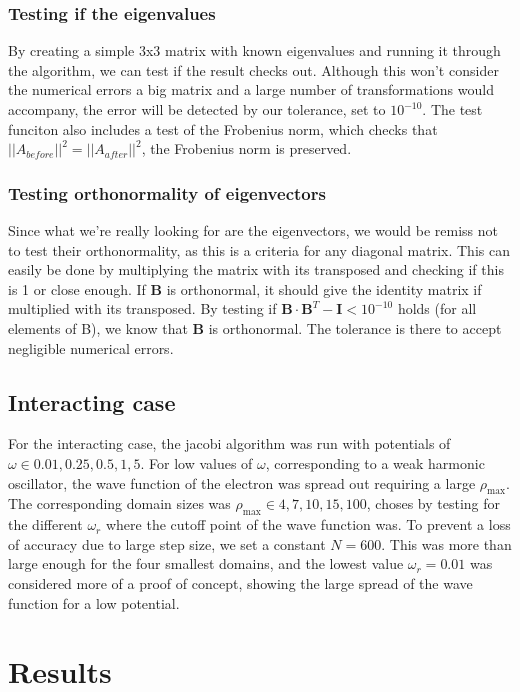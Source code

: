 \documentclass[10pt]{article}
\newcommand{\rhomax}{\rho_{\text{max}}}
\begin{document}
\begin{multicols}{2}
\subsubsection{Testing if the eigenvalues}
By creating a simple 3x3 matrix with known eigenvalues and running it
through the algorithm, we can test if the result checks out. Although this
won't consider the numerical errors a big matrix and a large number of
transformations would accompany, the error will be detected by our
tolerance, set to $10^{-10}$. The test funciton also includes a test of the
Frobenius norm, which checks that $||A_{before}||^2 = ||A_{after}||^2$, the
Frobenius norm is preserved.

\subsubsection{Testing orthonormality of eigenvectors}
Since what we're really looking for are the eigenvectors, we would be
remiss not to test their orthonormality, as this is a criteria for any
diagonal matrix. This can easily be done by multiplying the matrix with its
transposed and checking if this is 1 or close enough. If $\textbf{B}$ is
orthonormal, it should give the identity matrix if multiplied with its
transposed. By testing if $\textbf{B}\cdot\textbf{B}^T -\textbf{I}<
10^{-10}$ holds (for all elements of B), we know that $\textbf{B}$ is
orthonormal. The tolerance is there to accept negligible numerical errors.

\subsection{Interacting case} 
For the interacting case, the jacobi algorithm was run with potentials of
$\omega \in {0.01, 0.25, 0.5, 1, 5}$. For low  values of $\omega$,
corresponding to a weak harmonic oscillator, the wave function of the
electron was spread out requiring a large $\rhomax$. The corresponding
domain sizes was $\rhomax \in {4, 7, 10, 15, 100}$, choses by testing for
the different $\omega_r$ where the cutoff point of the wave function was.
To prevent a loss of accuracy due to large step size, we set a constant $N
= 600$. This was more than large enough for the four smallest domains, and the lowest
value $\omega_r=0.01$ was considered more of a proof of concept, showing
the large spread of the wave function for a low potential.

\section{Results}



\end{multicols}
\end{document}
